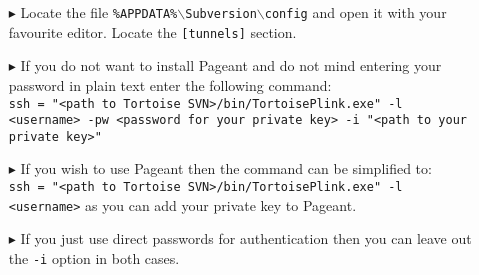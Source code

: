 \begin{enumerate}
  \item[$\blacktriangleright$] Locate the file \texttt{\%APPDATA\%$\backslash$Subversion$\backslash$config} and open it with your favourite editor. Locate the
  \texttt{[tunnels]} section.
  \item[$\blacktriangleright$] If you do not want to install Pageant and do not mind entering your password in plain text enter the following command:\\
  \texttt{ssh = "<path to Tortoise SVN>/bin/TortoisePlink.exe" -l \\<username> -pw <password for your private key> -i "<path to your private key>"}
  \item[$\blacktriangleright$] If you wish to use Pageant then the command can be simplified to:\\ \texttt{ssh = "<path to Tortoise SVN>/bin/TortoisePlink.exe"
  -l \\<username>} as you can add your private key to Pageant.
  \item[$\blacktriangleright$] If you just use direct passwords for authentication then you can leave out the \texttt{-i} option in both cases.
\end{enumerate}
